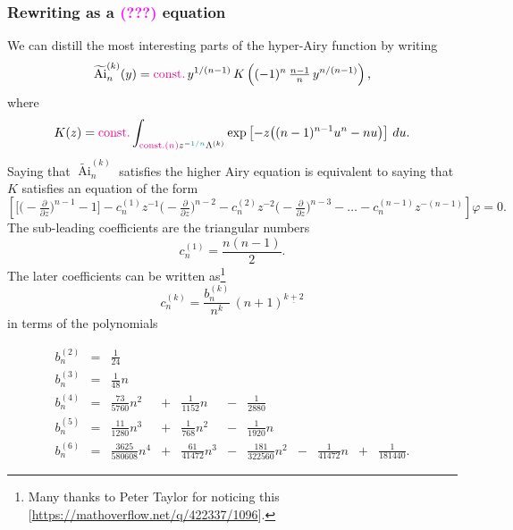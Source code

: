 \documentclass{article}
\DeclareMathOperator{\Ai}{Ai}
\begin{document}
\subsubsection{Rewriting as a \textcolor{magenta}{(???)} equation}
We can distill the most interesting parts of the hyper-Airy function by writing
\[ \widetilde{\Ai}^{(k)}_n(y) = \textcolor{magenta}{\text{const.}}\,y^{1/(n-1)}\,K\left((-1)^n\,\tfrac{n-1}{n}\,y^{n/(n-1)}\right), \]
where
\begin{equation}
K(z) = \textcolor{magenta}{\text{const.}} \int_{\textcolor{magenta}{\text{const.}(n)} z^{-\textcolor{DarkCyan}{1/n}}\Lambda^{(k)}} \exp\left[-z\big((n-1)^{n-1} u^n - nu\big)\right]\,du.
\end{equation}
Saying that $\widetilde{\Ai}^{(k)}_n$ satisfies the higher Airy equation is equivalent to saying that $K$ satisfies an equation of the form
\begin{equation}%
\left[ \big[ \big({-}\tfrac{\partial}{\partial z}\big)^{n-1} - 1 \big] - c_n^{(1)} z^{-1} \big({-}\tfrac{\partial}{\partial z}\big)^{n-2} - c_n^{(2)} z^{-2} \big({-}\tfrac{\partial}{\partial z}\big)^{n-3} - \ldots - c_n^{(n-1)} z^{-(n-1)} \right] \varphi = 0.
\end{equation}
The sub-leading coefficients are the triangular numbers
\[ c_n^{(1)} = \frac{n(n-1)}{2}. \]
\color{DarkCyan}
The later coefficients can be written as\footnote{Many thanks to Peter Taylor for noticing this [\url{https://mathoverflow.net/q/422337/1096}].}
\[ c_n^{(k)} = \frac{b_n^{(k)}}{n^k}\,(n+1)^{\underline{k+2}} \]
in terms of the polynomials

\begin{align*}
b_n^{(2)} & = & \tfrac{1}{24} \\
b_n^{(3)} & = & \tfrac{1}{48} n \\
b_n^{(4)} & = & \tfrac{73}{5760} n^2 & + & \tfrac{1}{1152} n & - & \tfrac{1}{2880} \\
b_n^{(5)} & = & \tfrac{11}{1280} n^{3} & + & \tfrac{1}{768} n^{2} & - & \tfrac{1}{1920} n \\
b_n^{(6)} & = & \tfrac{3625}{580608} n^{4} & + & \tfrac{61}{41472} n^{3} & - & \tfrac{181}{322560} n^{2} & - & \tfrac{1}{41472} n & + & \tfrac{1}{181440}. 
\end{align*}
\end{document}
